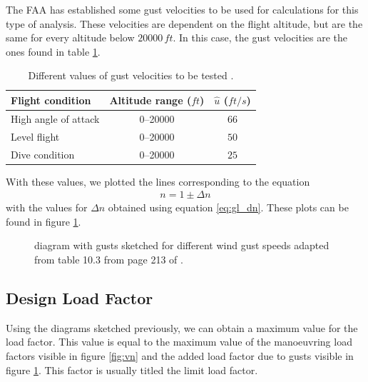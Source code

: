 \documentclass[english,fira]{ist-report}
\begin{document}
The FAA has established some gust velocities to be used for calculations for this type of analysis. These velocities are dependent on the flight altitude, but are the same for every altitude below $\num[group-separator = \text{~}]{20000}\,ft$. In this case, the gust velocities are the ones found in table \ref{tab:gustvelocities}.
\begin{table}[ht]
    \centering
    {
    \begin{tabular}{l c c}\toprule
        Flight condition        & Altitude range ($ft$) & $\hat{u}$ ($ft/s$)    \\
        \midrule
        High angle of attack    & \numrange{0}{20000}   & $66$                  \\
        Level flight            & \numrange{0}{20000}   & $50$                  \\
        Dive condition          & \numrange{0}{20000}   & $25$                  \\
        \bottomrule
    \end{tabular}
    }
    \caption{Different values of gust velocities to be tested \cite{corke}.}
    \label{tab:gustvelocities}
\end{table}

With these values, we plotted the lines corresponding to the equation
\begin{gather}
    n = 1 \pm \Delta n
\end{gather}
with the values for $\Delta n$ obtained using equation \ref{eq:gl_dn}. These plots can be found in figure \ref{fig:vn_gusts}.
\begin{figure}[ht]
    \centering
    
    \caption[\vnd{} diagram with gust speeds.]{\vnd{} diagram with gusts sketched for different wind gust speeds adapted from table 10.3 from page 213 of  \cite{corke}.}
    \label{fig:vn_gusts}
\end{figure}

\subsection{Design Load Factor}

Using the \vnd{} diagrams sketched previously, we can obtain a maximum value for the load factor. This value is equal to the maximum value of the manoeuvring load factors visible in figure \ref{fig:vn} and the added load factor due to gusts visible in figure \ref{fig:vn_gusts}. This factor is usually titled the limit load factor.
\end{document}
